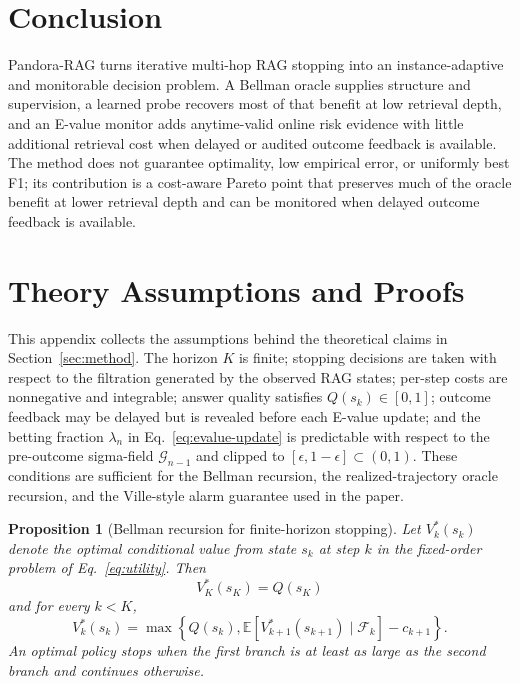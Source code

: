 \documentclass{article}
\newcommand{\method}{Pandora-RAG}
\newtheorem{proposition}{Proposition}[section]
\begin{document}
\section{Conclusion}
\label{sec:conclusion}

\method{} turns iterative multi-hop RAG stopping into an instance-adaptive and monitorable decision problem. A Bellman oracle supplies structure and supervision, a learned probe recovers most of that benefit at low retrieval depth, and an E-value monitor adds anytime-valid online risk evidence with little additional retrieval cost when delayed or audited outcome feedback is available. The method does not guarantee optimality, low empirical error, or uniformly best F1; its contribution is a cost-aware Pareto point that preserves much of the oracle benefit at lower retrieval depth and can be monitored when delayed outcome feedback is available.




\clearpage
\appendix

\section{Theory Assumptions and Proofs}
\label{app:proofs}

This appendix collects the assumptions behind the theoretical claims in Section~\ref{sec:method}. The horizon $K$ is finite; stopping decisions are taken with respect to the filtration generated by the observed RAG states; per-step costs are nonnegative and integrable; answer quality satisfies $Q(s_k)\in[0,1]$; outcome feedback may be delayed but is revealed before each E-value update; and the betting fraction $\lambda_n$ in Eq.~\eqref{eq:evalue-update} is predictable with respect to the pre-outcome sigma-field $\mathcal{G}_{n-1}$ and clipped to $[\epsilon,1-\epsilon]\subset(0,1)$. These conditions are sufficient for the Bellman recursion, the realized-trajectory oracle recursion, and the Ville-style alarm guarantee used in the paper.

\begin{proposition}[Bellman recursion for finite-horizon stopping]
\label{prop:bellman-appendix}
Let $V_k^*(s_k)$ denote the optimal conditional value from state $s_k$ at step $k$ in the fixed-order problem of Eq.~\eqref{eq:utility}. Then
\[
  V_K^*(s_K)=Q(s_K)
\]
and for every $k<K$,
\[
  V_k^*(s_k)=
  \max\left\{
    Q(s_k),
    \mathbb{E}\left[V_{k+1}^*(s_{k+1})\mid\mathcal{F}_k\right]-c_{k+1}
  \right\}.
\]
An optimal policy stops when the first branch is at least as large as the second branch and continues otherwise.
\end{proposition}
\end{document}
